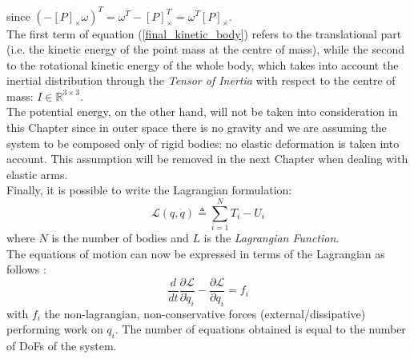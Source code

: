 \documentclass[a4paper,12pt,oneside]{report}
\begin{document}
since $(-[P]_{\times}\omega)^T=\omega^T-[P]_{\times}^T=\omega^T[P]_{\times}$.\\
The first term of equation (\ref{final_kinetic_body}) refers to the translational part (i.e. the kinetic energy of the point mass at the centre of mass), while the second to the rotational kinetic energy of the whole body, which takes into account the inertial distribution through the \textit{Tensor of Inertia} with respect to the centre of mass: $I \in \mathbb{R}^{3\times 3}$.\\

The potential energy, on the other hand, will not be taken into consideration in this Chapter since in outer space there is no gravity and we are assuming the system to be composed only of rigid bodies: no elastic deformation is taken into account. This assumption will be removed in the next Chapter when dealing with elastic arms.\\

Finally, it is possible to write the Lagrangian formulation:
\begin{equation}
  \mathcal{L} (q,\dot{q}) \triangleq \sum_{i=1}^NT_i-U_i
\label{energy_sum}
\end{equation}
where $N$ is the number of bodies and $L$ is the \textit{Lagrangian Function}.\\
The equations of motion can now be expressed in terms of the Lagrangian as follows \cite{eleven}:
\begin{equation}
  \frac{d}{dt}\frac{\partial \mathcal{L} }{\partial \dot{q}_i}-\frac{\partial \mathcal{L} }{\partial q_i}=f_i
  \label{lagrangian} 
\end{equation}
with $f_i$ the non-lagrangian, non-conservative forces (external/dissipative) performing work on $q_i$. The number of equations obtained is equal to the number of DoFs of the system.\\
\end{document}
